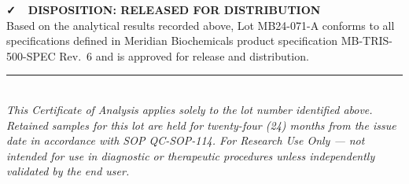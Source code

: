 \vspace{4mm}

\noindent
\begin{minipage}[c]{0.62\linewidth}
\begin{tcolorbox}[disposition]
\textbf{\large\faCheck\ \ DISPOSITION: RELEASED FOR DISTRIBUTION}\\[1mm]
\small Based on the analytical results recorded above, Lot MB24-071-A conforms to all specifications defined in Meridian Biochemicals product specification MB-TRIS-500-SPEC Rev.\ 6 and is approved for release and distribution.
\end{tcolorbox}
\end{minipage}\hfill
\begin{minipage}[c]{0.32\linewidth}
\centering
{}
\end{minipage}
\par

\vspace{4mm}
{\color{meridianGray!60}\rule{\linewidth}{0.4pt}}\\[1mm]
{\footnotesize\textit{This Certificate of Analysis applies solely to the lot number identified above. Retained samples for this lot are held for twenty-four (24) months from the issue date in accordance with SOP QC-SOP-114. For Research Use Only --- not intended for use in diagnostic or therapeutic procedures unless independently validated by the end user.}}
